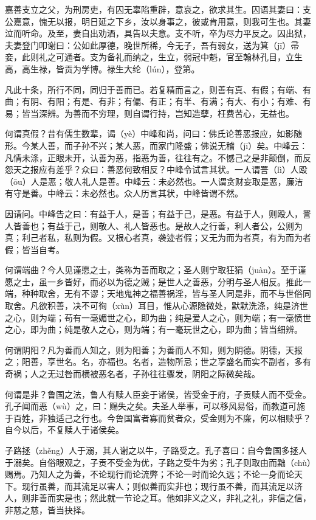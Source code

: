 \documentclass[12pt,UTF8]{ctexbook}
\begin{document}
嘉善支立之父，为刑房吏，有囚无辜陷重辟，意哀之，欲求其生。囚语其妻曰：支公嘉意，愧无以报，明日延之下乡，汝以身事之，彼或肯用意，则我可生也。其妻泣而听命。及至，妻自出劝酒，具告以夫意。支不听，卒为尽力平反之。囚出狱，夫妻登门叩谢曰：公如此厚德，晚世所稀，今无子，吾有弱女，送为箕（jī）帚妾，此则礼之可通者。支为备礼而纳之，生立，弱冠中魁，官至翰林孔目，立生高，高生禄，皆贡为学博。禄生大纶（lún），登第。

凡此十条，所行不同，同归于善而已。若复精而言之，则善有真、有假；有端、有曲；有阴、有阳；有是、有非；有偏、有正；有半、有满；有大、有小；有难、有易；皆当深辨。为善而不穷理，则自谓行持，岂知造孽，枉费苦心，无益也。

何谓真假？昔有儒生数辈，谒（yè）中峰和尚，问曰：佛氏论善恶报应，如影随形。今某人善，而子孙不兴；某人恶，而家门隆盛；佛说无稽（jī）矣。中峰云：凡情未涤，正眼未开，认善为恶，指恶为善，往往有之。不憾己之是非颠倒，而反怨天之报应有差乎？众曰：善恶何致相反？中峰令试言其状。一人谓詈（lì）人殴（ōu）人是恶；敬人礼人是善。中峰云：未必然也。一人谓贪财妄取是恶，廉洁有守是善。中峰云：未必然也。众人历言其状，中峰皆谓不然。

因请问。中峰告之曰：有益于人，是善；有益于己，是恶。有益于人，则殴人，詈人皆善也；有益于己，则敬人、礼人皆恶也。是故人之行善，利人者公，公则为真；利己者私，私则为假。又根心者真，袭迹者假；又无为而为者真，有为而为者假；皆当自考。

何谓端曲？今人见谨愿之士，类称为善而取之；圣人则宁取狂狷（juàn）。至于谨愿之士，虽一乡皆好，而必以为德之贼；是世人之善恶，分明与圣人相反。推此一端，种种取舍，无有不谬；天地鬼神之福善祸淫，皆与圣人同是非，而不与世俗同取舍。凡欲积善，决不可徇（xùn）耳目，惟从心源隐微处，默默洗涤，纯是济世之心，则为端；苟有一毫媚世之心，即为曲；纯是爱人之心，则为端；有一毫愤世之心，即为曲；纯是敬人之心，则为端；有一毫玩世之心，即为曲；皆当细辨。

何谓阴阳？凡为善而人知之，则为阳善；为善而人不知，则为阴德。阴德，天报之；阳善，享世名。名，亦福也。名者，造物所忌；世之享盛名而实不副者，多有奇祸；人之无过咎而横被恶名者，子孙往往骤发，阴阳之际微矣哉。

何谓是非？鲁国之法，鲁人有赎人臣妾于诸侯，皆受金于府，子贡赎人而不受金。孔子闻而恶（wù）之，曰：赐失之矣。夫圣人举事，可以移风易俗，而教道可施于百姓，非独适己之行也。今鲁国富者寡而贫者众，受金则为不廉，何以相赎乎？自今以后，不复赎人于诸侯矣。

子路拯（zhěng）人于溺，其人谢之以牛，子路受之。孔子喜曰：自今鲁国多拯人于溺矣。自俗眼观之，子贡不受金为优，子路之受牛为劣；孔子则取由而黜（chù）赐焉。乃知人之为善，不论现行而论流弊；不论一时而论久远；不论一身而论天下。现行虽善，而其流足以害人；则似善而实非也；现行虽不善，而其流足以济人，则非善而实是也；然此就一节论之耳。他如非义之义，非礼之礼，非信之信，非慈之慈，皆当抉择。
\end{document}

